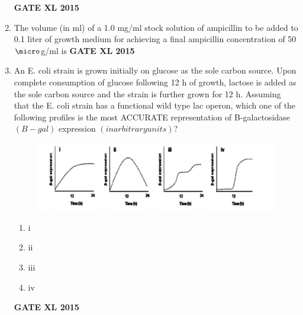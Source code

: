 \documentclass[journal,12pt,onecolumn]{IEEEtran}
\begin{document}
\begin{enumerate}
\hfill{\textbf{GATE XL 2015}}
\item  The volume (in ml) of a 1.0 mg/ml stock solution of ampicillin to be added to 0.1 liter of growth medium for achieving a final ampicillin concentration of 50 $\micro$g/ml is
\hfill{\textbf{GATE XL 2015}}
\item An E. coli strain is grown initially on glucose as the sole carbon source. Upon complete consumption of glucose following 12 h of growth, lactose is added as the sole carbon source and the strain is further grown for 12 h. Assuming that the E. coli strain has a functional wild type lac operon, which one of the following profiles is the most ACCURATE representation of B-galactosidase $(B-gal)$ expression $(in arbitrary units)$?
	\begin{figure}[h!]
		\centering
	\includegraphics[width=15cm]{85}
		    \caption*{}
		\label{fig:Q85}
	\end{figure}
    \begin{enumerate}
            \item i
	    \item ii
	    \item iii
            \item iv
    \end{enumerate}
\hfill{\textbf{GATE XL 2015}}
	

\end{enumerate}
\end{document}

